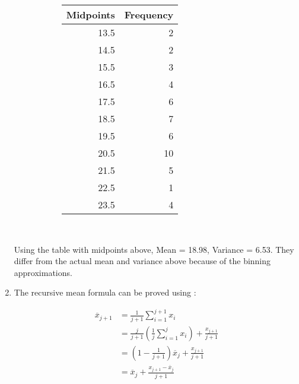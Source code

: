 \begin{enumerate}
	\begin{figure}[H]
		\begin{subfigure}[]{0.45\linewidth}
			\centering
			\begin{table}[H]
				\centering
				\begin{tabular}{rr}
					\toprule
					Midpoints &  Frequency \\
					\midrule
					13.5 &          2 \\
					14.5 &          2 \\
					15.5 &          3 \\
					16.5 &          4 \\
					17.5 &          6 \\
					18.5 &          7 \\
					19.5 &          6 \\
					20.5 &         10 \\
					21.5 &          5 \\
					22.5 &          1 \\
					23.5 &          4 \\
					\bottomrule
				\end{tabular}
			\end{table}
		\end{subfigure}
		\begin{subfigure}[]{0.45\linewidth}
			\centering
		\end{subfigure} \\		
	\end{figure}
	
	Using the table with midpoints above, Mean = 18.98, Variance = 6.53. They differ from the actual mean and variance above because of the binning approximations.
	
	\item The recursive mean formula can be proved using : 
	
	
		\begin{align}
			\overline{x}_{j + 1} &= \frac{1}{j + 1} \sum\limits_{i = 1}^{j + 1} x_{i} \\
			& = \frac{j}{j + 1} \left( \frac{1}{j} \sum\limits_{i = 1}^{j} x_{i} \right) + \frac{x_{j + 1}}{j + 1} \\
			& = \left( 1 - \frac{1}{j + 1} \right) \overline{x}_{j} + \frac{x_{j + 1}}{j + 1} \\
			& = \overline{x}_{j} + \frac{x_{j + 1} - \overline{x}_{j}}{j + 1}
		\end{align}
	 \\
	

\end{enumerate}

